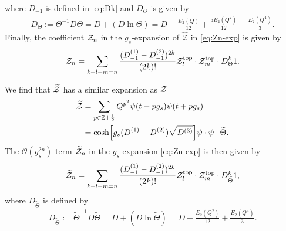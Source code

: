 \documentclass[11pt]{article}
\newcommand{\hf}{\frac{1}{2}}
\def\h#1{\widehat{#1}}
\def\rt#1{\sqrt{#1}}
\newcommand{\Ztop}{\mathcal{Z}^{\text{top}}}
\renewcommand{\[}{\begin{eqnarray}}
\renewcommand{\]}{\end{eqnarray}}
\newcommand{\Zeven}{{\cal Z}}
\newcommand{\Zodd}{{\widetilde{\cal Z}}}
\newcommand{\Thetaeven}{\Theta}
\newcommand{\Thetaodd}{{\widetilde{\Theta}}}
\newcommand{\DTodd}{D_\Thetaodd}
\begin{document}
where $D_{-1}$ is defined in \eqref{eq:Dk}
and 
$D_{\Thetaeven}$ is given by
\begin{equation}
\begin{aligned}
 D_{\Thetaeven}:=\Thetaeven^{-1}D\Thetaeven
=D+(D\ln\Thetaeven)
=D-\frac{E_2(Q)}{12}+\frac{5E_2(Q^2)}{12}-\frac{E_2(Q^4)}{3}.
\end{aligned} 
\label{eq:DTe}
\end{equation}
Finally, the  coefficient $\Zeven_n$ in the $g_s$-expansion
of $\h{\mathcal{Z}}$ in
\eqref{eq:Zn-exp} is given by
\begin{align}
 \Zeven_n=\sum_{k+l+m=n}\frac{(D_{-1}^{(1)}-D_{-1}^{(2)})^{2k}}{(2k)!}
\Ztop_l\cdot\Ztop_m \cdot D^k_{\Thetaeven}1.
\label{eq:Zfull-genus}
\end{align}

We find that $\Zodd$ has a similar expansion as $\Zeven$
\begin{align}
 \begin{aligned}
  \Zodd&=\sum_{p\in\mathbb{Z}+\hf}
Q^{p^2}\psi(t-pg_s)\psi(t+pg_s)\\
&=\cosh \Bigl[g_s(D^{(1)}-D^{(2)})\rt{D^{(3)}}\Bigr]\psi\cdot \psi\cdot
\Thetaodd.
 \end{aligned}
\end{align}
%
The  $\mathcal{O}(g_s^{2n})$ term $\Zodd_n$ in the $g_s$-expansion
\eqref{eq:Zn-exp} is then given by
%
\begin{align}
  \Zodd_n=\sum_{k+l+m=n}\frac{(D_{-1}^{(1)}-D_{-1}^{(2)})^{2k}}{(2k)!}
\Ztop_l\cdot\Ztop_m\cdot \DTodd^k1,
\label{eq:Zodd-genus}
\end{align}
where $\DTodd$ is defined by
\begin{equation}
\begin{aligned}
  \DTodd:=\Thetaodd^{-1}D\Thetaodd
=D+(D\ln\Thetaodd)
=D-\frac{E_2(Q^2)}{12}+\frac{E_2(Q^4)}{3}.
\end{aligned} 
\label{eq:DTo}
\end{equation}
%
\end{document}
